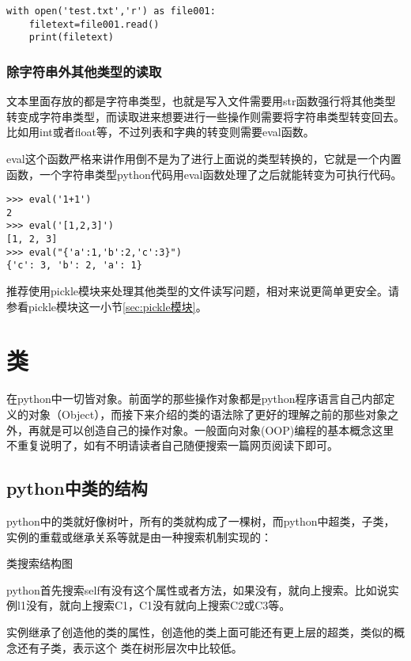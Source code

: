 \documentclass[12pt,oneside]{book}
\begin{document}
\begin{common-format}
\begin{Verbatim}
with open('test.txt','r') as file001:
    filetext=file001.read()
    print(filetext)
\end{Verbatim}




\subsection{除字符串外其他类型的读取}
文本里面存放的都是字符串类型，也就是写入文件需要用str函数强行将其他类型转变成字符串类型，而读取进来想要进行一些操作则需要将字符串类型转变回去。比如用int或者float等，不过列表和字典的转变则需要eval函数。

eval这个函数严格来讲作用倒不是为了进行上面说的类型转换的，它就是一个内置函数，一个字符串类型python代码用eval函数处理了之后就能转变为可执行代码。
\begin{Verbatim}
>>> eval('1+1')
2
>>> eval('[1,2,3]')
[1, 2, 3]
>>> eval("{'a':1,'b':2,'c':3}")
{'c': 3, 'b': 2, 'a': 1}
\end{Verbatim}

推荐使用pickle模块来处理其他类型的文件读写问题，相对来说更简单更安全。请参看pickle模块这一小节\ref{sec:pickle模块}。







\chapter{类}
在python中一切皆对象。前面学的那些操作对象都是python程序语言自己内部定义的对象（Object），而接下来介绍的类的语法除了更好的理解之前的那些对象之外，再就是可以创造自己的操作对象。一般面向对象(OOP)编程的基本概念这里不重复说明了，如有不明请读者自己随便搜索一篇网页阅读下即可。

\section{python中类的结构}
python中的类就好像树叶，所有的类就构成了一棵树，而python中超类，子类，实例的重载或继承关系等就是由一种搜索机制实现的：
\begin{fig}{类搜索结构图}
\label{fig:类搜索结构图}
\end{fig}
python首先搜索self有没有这个属性或者方法，如果没有，就向上搜索。比如说实例l1没有，就向上搜索C1，C1没有就向上搜索C2或C3等。

实例继承了创造他的类的属性，创造他的类上面可能还有更上层的超类，类似的概念还有子类，表示这个 类在树形层次中比较低。


\end{common-format}
\end{document}
